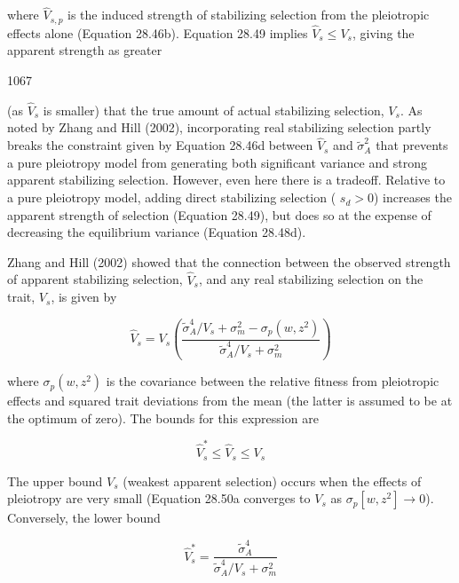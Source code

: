 \documentclass{article}
\begin{document}
where  $ \widehat{V}_{s,p} $ is the induced strength of stabilizing selection from the pleiotropic effects alone (Equation 28.46b). Equation 28.49 implies  $ \widehat{V}_{s} \leq V_{s} $, giving the apparent strength as greater

1067

(as  $ \hat{V}_s $ is smaller) that the true amount of actual stabilizing selection,  $ V_s $. As noted by Zhang and Hill (2002), incorporating real stabilizing selection partly breaks the constraint given by Equation 28.46d between  $ \hat{V}_s $ and  $ \tilde{\sigma}_A^2 $ that prevents a pure pleiotropy model from generating both significant variance and strong apparent stabilizing selection. However, even here there is a tradeoff. Relative to a pure pleiotropy model, adding direct stabilizing selection ( $ s_d > 0 $) increases the apparent strength of selection (Equation 28.49), but does so at the expense of decreasing the equilibrium variance (Equation 28.48d).

Zhang and Hill (2002) showed that the connection between the observed strength of apparent stabilizing selection,  $ \widehat{V}_{s} $, and any real stabilizing selection on the trait,  $ V_{s} $, is given by

\begin{equation}
\widehat{V}_{s}=V_{s}\left(\frac{\widetilde{\sigma}_{A}^{4}/V_{s}+\sigma_{m}^{2}-\sigma_{p}(w,z^{2})}{\widetilde{\sigma}_{A}^{4}/V_{s}+\sigma_{m}^{2}}\right)
\tag{28.50a}
\label{eq:28_50a}
\end{equation}

where  $ \sigma_{p}(w,z^{2}) $ is the covariance between the relative fitness from pleiotropic effects and squared trait deviations from the mean (the latter is assumed to be at the optimum of zero). The bounds for this expression are

\begin{equation}
\widehat{V}_{s}^{*}\leq\widehat{V}_{s}\leq V_{s}
\tag{28.50b}
\label{eq:28_50b}
\end{equation}

The upper bound  $ V_s $ (weakest apparent selection) occurs when the effects of pleiotropy are very small (Equation 28.50a converges to  $ V_s $ as  $ \sigma_p[w, z^2] \to 0 $). Conversely, the lower bound

\begin{equation}
\widehat{V}_{s}^{*}=\frac{\widetilde{\sigma}_{A}^{4}}{\widetilde{\sigma}_{A}^{4}/V_{s}+\sigma_{m}^{2}}
\tag{28.50c}
\label{eq:28_50c}
\end{equation}
\end{document}
